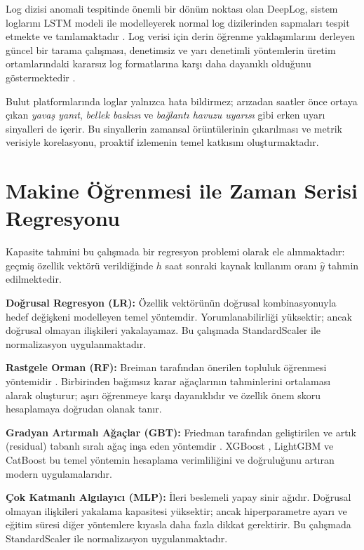 Log dizisi anomali tespitinde önemli bir dönüm noktası olan DeepLog, sistem loglarını LSTM modeli ile modelleyerek normal log dizilerinden sapmaları tespit etmekte ve tanılamaktadır \autocite{du2017}.
Log verisi için derin öğrenme yaklaşımlarını derleyen güncel bir tarama çalışması, denetimsiz ve yarı denetimli yöntemlerin üretim ortamlarındaki kararsız log formatlarına karşı daha dayanıklı olduğunu göstermektedir \autocite{landauer2023}.

Bulut platformlarında loglar yalnızca hata bildirmez; arızadan saatler önce ortaya çıkan \textit{yavaş yanıt}, \textit{bellek baskısı} ve \textit{bağlantı havuzu uyarısı} gibi erken uyarı sinyalleri de içerir.
Bu sinyallerin zamansal örüntülerinin çıkarılması ve metrik verisiyle korelasyonu, proaktif izlemenin temel katkısını oluşturmaktadır.


\section{Makine Öğrenmesi ile Zaman Serisi Regresyonu}

Kapasite tahmini bu çalışmada bir regresyon problemi olarak ele alınmaktadır: geçmiş özellik vektörü verildiğinde $h$ saat sonraki kaynak kullanım oranı $\hat{y}$ tahmin edilmektedir.

\textbf{Doğrusal Regresyon (LR):}
Özellik vektörünün doğrusal kombinasyonuyla hedef değişkeni modelleyen temel yöntemdir.
Yorumlanabilirliği yüksektir; ancak doğrusal olmayan ilişkileri yakalayamaz.
Bu çalışmada StandardScaler ile normalizasyon uygulanmaktadır.

\textbf{Rastgele Orman (RF):}
Breiman tarafından önerilen topluluk öğrenmesi yöntemidir \autocite{breiman2001}.
Birbirinden bağımsız karar ağaçlarının tahminlerini ortalaması alarak oluşturur; aşırı öğrenmeye karşı dayanıklıdır ve özellik önem skoru hesaplamaya doğrudan olanak tanır.

\textbf{Gradyan Artırmalı Ağaçlar (GBT):}
Friedman tarafından geliştirilen ve artık (residual) tabanlı sıralı ağaç inşa eden yöntemdir \autocite{friedman2001}.
XGBoost \autocite{chen2016}, LightGBM \autocite{ke2017} ve CatBoost \autocite{prokhorenkova2018} bu temel yöntemin hesaplama verimliliğini ve doğruluğunu artıran modern uygulamalarıdır.

\textbf{Çok Katmanlı Algılayıcı (MLP):}
İleri beslemeli yapay sinir ağıdır.
Doğrusal olmayan ilişkileri yakalama kapasitesi yüksektir; ancak hiperparametre ayarı ve eğitim süresi diğer yöntemlere kıyasla daha fazla dikkat gerektirir.
Bu çalışmada StandardScaler ile normalizasyon uygulanmaktadır.

